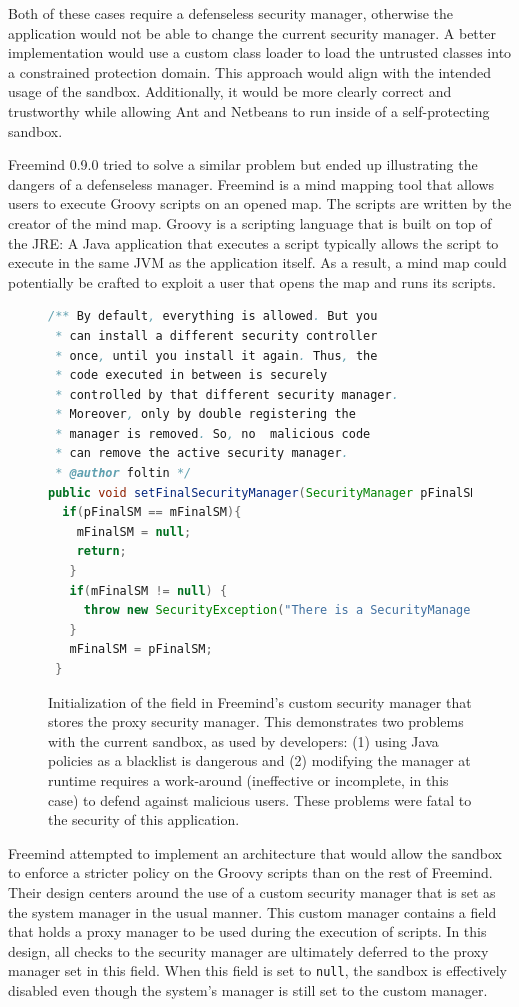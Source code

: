 \documentclass{sig-alternate}
\begin{document}
Both of these cases require a defenseless security manager, otherwise
the application would not be able to change the current security manager.
A better implementation would use a custom class
loader to load the untrusted classes into a constrained protection
domain. This approach would align with the intended usage of the sandbox.
Additionally, it would be more clearly correct and trustworthy while
allowing Ant and Netbeans to run inside of a self-protecting sandbox.

Freemind 0.9.0 tried to solve a similar problem but ended up illustrating
the dangers of a defenseless manager. Freemind is a mind mapping tool
that allows users to execute Groovy scripts on an opened map. The
scripts are written by the creator of the mind map. Groovy is a scripting
language that is built on top of the JRE: A Java application that
executes a script typically allows the script to execute in the same
JVM as the application itself. As a result, a mind map could potentially
be crafted to exploit a user that opens the map and runs its scripts.

\begin{figure}
\begin{lstlisting}[language=Java,firstnumber=31]
/** By default, everything is allowed. But you
 * can install a different security controller
 * once, until you install it again. Thus, the
 * code executed in between is securely
 * controlled by that different security manager.  
 * Moreover, only by double registering the
 * manager is removed. So, no  malicious code 
 * can remove the active security manager.  
 * @author foltin */
public void setFinalSecurityManager(SecurityManager pFinalSM) {
  if(pFinalSM == mFinalSM){
    mFinalSM = null;
    return;
   } 		
   if(mFinalSM != null) {
     throw new SecurityException("There is a SecurityManager installed already."); 		
   } 		
   mFinalSM = pFinalSM;
 }	
\end{lstlisting}
\caption{Initialization of the field in Freemind's custom security
  manager\label{fig:Freemind-Security-Manager} that stores the proxy security
  manager. This demonstrates two problems with the current sandbox, as used by developers: (1) 
  using Java policies as a blacklist is
  dangerous and (2) modifying the manager at runtime requires 
  a work-around (ineffective or incomplete, in this case) to defend against malicious
  users. These problems were fatal to the security of this application.}
\end{figure}

Freemind attempted to implement an architecture that would allow the
sandbox to enforce a stricter policy on the Groovy scripts than on
the rest of Freemind. Their design centers around the use of a custom
security manager that is set as the system manager in the usual manner.
This custom manager contains a field that holds a proxy manager to be used during the execution of
scripts. In this design, all checks to the security manager are ultimately
deferred to the proxy manager set in this field. When
this field is set to \texttt{null}, the sandbox is effectively disabled
even though the system's manager is still set to the custom manager.
\end{document}
